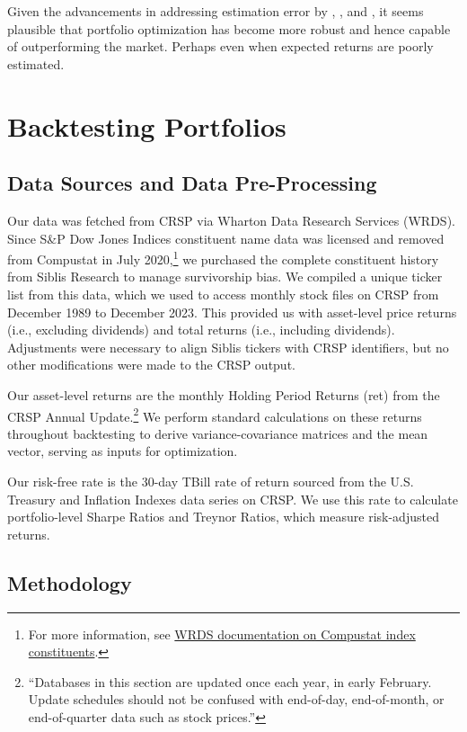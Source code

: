 \documentclass[12pt,letterpaper]{article}
\begin{document}
Given the advancements in addressing estimation error by , ,  and , it seems plausible that portfolio optimization has become more robust and hence capable of outperforming the market. Perhaps even when expected returns are poorly estimated.

\section{Backtesting Portfolios}

\subsection{Data Sources and Data Pre-Processing}
Our data was fetched from CRSP via Wharton Data Research Services (WRDS). Since S\&P Dow Jones Indices constituent name data was licensed and removed from Compustat in July 2020,\footnote{For more information, see \href{https://wrds-www.wharton.upenn.edu/pages/support/support-articles/compustat/north-america/compustat-index-constituents-removed/}{WRDS documentation on Compustat index constituents}.}
we purchased the complete constituent history from Siblis Research to manage survivorship bias. We compiled a unique ticker list from this data, which we used to access monthly stock files on CRSP from December 1989 to December 2023. This provided us with asset-level price returns (i.e., excluding dividends) and total returns (i.e., including dividends). Adjustments were necessary to align Siblis tickers with CRSP identifiers, but no other modifications were made to the CRSP output.


Our asset-level returns are the monthly Holding Period Returns (ret) from the CRSP Annual Update.\footnote{“Databases in this section are updated once each year, in early February. Update schedules should not be confused with end-of-day, end-of-month, or end-of-quarter data such as stock prices.”} We perform standard calculations on these returns throughout backtesting to derive variance-covariance matrices and the mean vector, serving as inputs for optimization.

Our risk-free rate is the 30-day TBill rate of return sourced from the U.S. Treasury and Inflation Indexes data series on CRSP. We use this rate to calculate portfolio-level Sharpe Ratios and Treynor Ratios, which measure risk-adjusted returns.

\subsection{Methodology}
\end{document}

